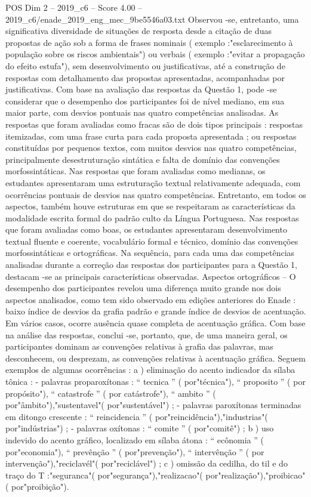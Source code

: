 \begin{textsample}{POS Dim 2 – 2019\_c6 – Score 4.00 – 2019\_c6/enade\_2019\_eng\_mec\_9be5546a03.txt}
Observou -se, entretanto, uma significativa diversidade de situações de resposta desde a citação de duas propostas de ação sob a forma de frases nominais ( exemplo :"esclarecimento à população sobre os riscos ambientais") ou verbais ( exemplo :"evitar a propagação do efeito estufa"), sem desenvolvimento ou justificativas, até a construção de respostas com detalhamento das propostas apresentadas, acompanhadas por justificativas.
Com base na avaliação das respostas da Questão 1, pode -se considerar que o desempenho dos participantes foi de nível mediano, em sua maior parte, com desvios pontuais nas quatro competências analisadas.
As respostas que foram avaliadas como fracas são de dois tipos principais : respostas itemizadas, com uma frase curta para cada proposta apresentada ; ou respostas constituídas por pequenos textos, com muitos desvios nas quatro competências, principalmente desestruturação sintática e falta de domínio das convenções morfossintáticas.
Nas respostas que foram avaliadas como medianas, os estudantes apresentaram uma estruturação textual relativamente adequada, com ocorrências pontuais de desvios nas quatro competências.
Entretanto, em todos os aspectos, também houve estruturas em que se respeitaram as características da modalidade escrita formal do padrão culto da Língua Portuguesa.
Nas respostas que foram avaliadas como boas, os estudantes apresentaram desenvolvimento textual fluente e coerente, vocabulário formal e técnico, domínio das convenções morfossintáticas e ortográficas.
Na sequência, para cada uma das competências analisadas durante a correção das respostas dos participantes para a Questão 1, destacam -se as principais características observadas.
Aspectos ortográficos – O desempenho dos participantes revelou uma diferença muito grande nos dois aspectos analisados, como tem sido observado em edições anteriores do Enade : baixo índice de desvios da grafia padrão e grande índice de desvios de acentuação.
Em vários casos, ocorre ausência quase completa de acentuação gráfica.
Com base na análise das respostas, conclui -se, portanto, que, de uma maneira geral, os participantes dominam as convenções relativas à grafia das palavras, mas desconhecem, ou desprezam, as convenções relativas à acentuação gráfica.
Seguem exemplos de algumas ocorrências : a ) eliminação do acento indicador da sílaba tônica : - palavras proparoxítonas : “ tecnica ” ( por"técnica"), “ proposito ” ( por propósito"), “ catastrofe ” ( por catástrofe"), “ ambito ” ( por"âmbito"),"sustentavel"( por"sustentável") ; - palavras paroxítonas terminadas em ditongo crescente : “ reincidencia ” ( por"reincidência"),"industrias"( por"indústrias") ; - palavras oxítonas : “ comite ” ( por"comitê") ; b ) uso indevido do acento gráfico, localizado em sílaba átona : “ ecônomia ” ( por"economia"), “ prevênção ” ( por"prevenção"), “ intervênção ” ( por intervenção"),"reciclavél"( por"reciclável") ; c ) omissão da cedilha, do til e do traço do T :"seguranca"( por"segurança"),"realizacao"( por"realização"),"proibicao"( por"proibição").

\end{textsample}
